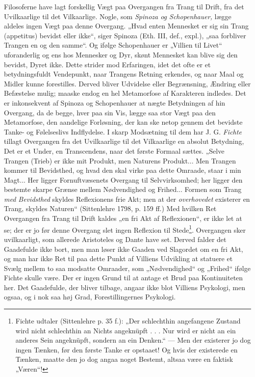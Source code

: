 \documentclass[12pt,a4paper,openany]{book}
\newcommand{\opage}[1]{\marginnote{\footnotesize\textit{[#1]}}}
\begin{document}
Filosoferne have lagt forskellig Vægt paa Overgangen fra
Trang til Drift, fra det Uvilkaarlige til det Vilkaarlige. Nogle,
som \textit{Spinoza og Schopenhauer,} lægge aldeles ingen Vægt paa
denne Overgang. „Hvad enten Mennesket er sig sin Trang
(appetitus) bevidst eller ikke“, siger Spinoza (Eth. III, def.,
expl.), „saa forbliver Trangen en og den samme“. Og ifølge
Schopenhauer er „Villien til Livet“ uforanderlig og ens hos
Mennesker og Dyr, skønt Mennesket kan blive sig den bevidst,
Dyret ikke. Dette strider mod Erfaringen, idet det ofte er et
betydningsfuldt Vendepunkt, naar Trangens Retning erkendes,
og naar Maal og Midler kunne forestilles. Derved bliver Udvidelse
eller Begrænsning, Ændring eller Befæstelse mulig;
maaske endog en hel Metamorfose af Karakteren indledes. Det
er inkonsekvent af Spinoza og Schopenhauer at nægte Betydningen
af hin Overgang, da de begge, hver paa sin Vis, lægge
saa stor Vægt paa den Metamorfose, den aandelige Forløsning,
der kan ske netop gennem det bevidste Tanke- og Følelseslivs
Indflydelse. I skarp Modsætning til dem har J. G. \textit{Fichte} tillagt
Overgangen fra det Uvilkaarlige til det Vilkaarlige en absolut
\setcounter{footnote}{0}%
\opage{40}Betydning, Det er et Under, en Transcendens, naar det første
Formaal sættes. „Selve Trangen (Trieb) er ikke mit Produkt,
men Naturens Produkt... Men Trangen kommer til Bevidsthed,
og hvad den skal virke paa dette Omraade, staar i min
Magt... Her ligger Fornuftvæsenets Overgang til Selvvirksomhed;
her ligger den bestemte skarpe Grænse mellem Nødvendighed
og Frihed... Formen som Trang \textit{med Bevidsthed}
skyldes Reflexionens frie Akt; men at der \textit{overhovedet} existerer
en Trang, skyldes Naturen“ (Sittenlehre 1798, p. 159 ff.) Med
hvilken Ret Overgangen fra Trang til Drift kaldes „en fri Akt
af Reflexionen“, er ikke let at se; der er jo før denne Overgang
slet ingen Reflexion til Stede\footnote[1]{Fichte udtaler (Sittenlehre p. 35 f.): „Der schlechthin angefangene Zustand wird nicht schlechthin an Nichts angeknüpft . . . Nur wird er nicht an ein anderes Sein angeknüpft, sondern an ein Denken.“ --- Men der existerer jo dog ingen Tænken, før den første Tanke er opstaaet! Og hvis der existerede en Tænken, maatte den jo dog angaa noget Bestemt, altsaa være en faktisk „Væren“!}. Overgangen sker uvilkaarligt,
som allerede Aristoteles og Dante have set. Derved
falder det Gaadefulde ikke bort, men man løser ikke Gaaden
ved Slagordet om en fri Akt, og man har ikke Ret til paa
dette Punkt af Villiens Udvikling at statuere et Svælg mellem
to saa modsatte Omraader, som „Nødvendighed“ og „Frihed“
ifølge Fichte skulle være. Der er ingen Grund til at antage
et Brud paa Kontinuiteten her. Det Gaadefulde, der bliver tilbage,
angaar ikke blot Villiens Psykologi, men ogsaa, og i nok
saa høj Grad, Forestillingernes Psykologi.
\end{document}
